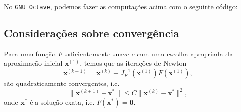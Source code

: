\begin{ex}
\ifisoctave
No \verb+GNU Octave+, podemos fazer as computações acima com o seguinte \href{https://github.com/phkonzen/notas/blob/master/src/MatematicaNumerica/cap_snl/dados/ex_newton_intro/ex_newton_intro.m}{código}:

\fi
\end{ex}

\subsection{Considerações sobre convergência}

Para uma função $F$ suficientemente suave e com uma escolha apropriada da aproximação inicial $\pmb{x}^{(1)}$, temos que as iterações de Newton
\begin{equation}
  \pmb{x}^{(k+1)} = \pmb{x}^{(k)} - J_F^{-1}(\pmb{x}^{(1)})F(\pmb{x}^{(1)}),
\end{equation}
são quadraticamente convergentes, i.e.
\begin{equation}
  \|\pmb{x}^{(k+1)} - \pmb{x}^*\| \leq C\|\pmb{x}^{(k)}-\pmb{x}^*\|^2,
\end{equation}
onde $\pmb{x}^*$ é a solução exata, i.e. $F(\pmb{x}^*) = \pmb{0}$.

